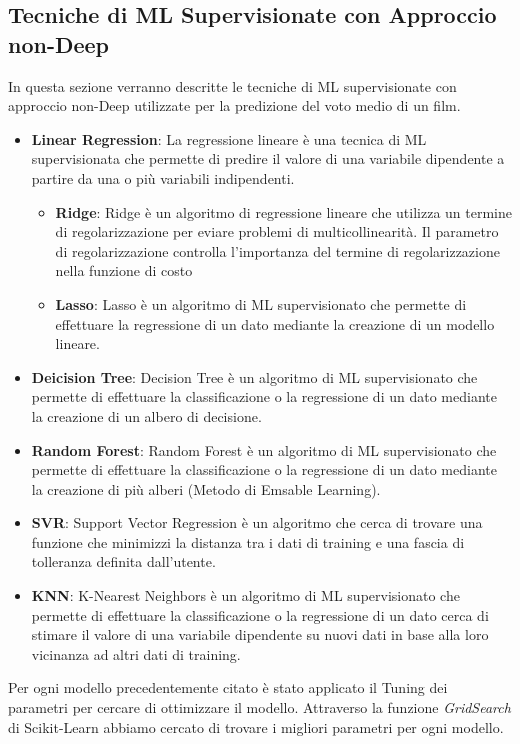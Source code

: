 \documentclass[../../Report.tex]{subfiles}
\begin{document}
\subsection{Tecniche di ML Supervisionate con Approccio non-Deep}
In questa sezione verranno descritte le tecniche di ML supervisionate con approccio non-Deep utilizzate per la predizione del voto medio di un film.
\begin{itemize}
    \item \textbf{Linear Regression}: La regressione lineare è una tecnica di ML supervisionata che permette di predire il valore di una variabile dipendente a partire da una o più variabili indipendenti.
    \begin{itemize}
        \item \textbf{Ridge}: Ridge è un algoritmo di regressione lineare che utilizza un termine di regolarizzazione per eviare problemi di multicollinearità. Il parametro di regolarizzazione controlla l'importanza del termine di regolarizzazione nella funzione di costo
        \item \textbf{Lasso}: Lasso è un algoritmo di ML supervisionato che permette di effettuare la regressione di un dato mediante la creazione di un modello lineare.
    \end{itemize}
    \item \textbf{Deicision Tree}: Decision Tree è un algoritmo di ML supervisionato che permette di effettuare la classificazione o la regressione di un dato mediante la creazione di un albero di decisione.
    \item \textbf{Random Forest}: Random Forest è un algoritmo di ML supervisionato che permette di effettuare la classificazione o la regressione di un dato mediante la creazione di più alberi (Metodo di Emsable Learning).
    \item \textbf{SVR}: Support Vector Regression è un algoritmo che cerca di trovare una funzione che minimizzi la distanza tra i dati di training e una fascia di tolleranza definita dall'utente.
    \item \textbf{KNN}: K-Nearest Neighbors è un algoritmo di ML supervisionato che permette di effettuare la classificazione o la regressione di un dato cerca di stimare il valore di una variabile dipendente su nuovi dati in base alla loro vicinanza ad altri dati di training.
\end{itemize}

Per ogni modello precedentemente citato è stato applicato il Tuning dei parametri per cercare di ottimizzare il modello.
Attraverso la funzione \textit{GridSearch} di Scikit-Learn abbiamo cercato di trovare i migliori parametri per ogni modello.
\end{document}
